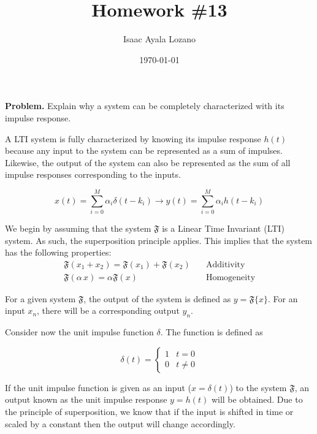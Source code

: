 \documentclass[a4paper,12pt]{article}
\title{Homework \#13}
\author{Isaac Ayala Lozano}
\date{\today}
\begin{document}
\maketitle

\textbf{Problem.} Explain why a system can be completely characterized with its impulse response.

\begin{tcolorbox}[colback=black!5!white,colframe=black!75!black]
  A LTI system is fully characterized by knowing its impulse response $h(t)$ because any input to the system can be represented as a sum of impulses. Likewise, the output of the system can also be represented as the sum of all impulse responses corresponding to the inputs.

  \begin{equation}
   x (t) = \sum_{i = 0}^M \alpha_i \delta(t-k_i) \rightarrow y(t) = \sum_{i = 0}^M \alpha_i h(t-k_i)
  \end{equation}

\end{tcolorbox}

We begin by assuming that the system $\mathfrak{F}$ is a Linear Time Invariant (LTI) system.
As such, the superposition principle applies.
This implies that the system has the following properties:
\begin{align*}
 \mathfrak{F} (x_1 + x_2) = \mathfrak{F}(x_1) + \mathfrak{F}(x_2)  & \quad \text{Additivity}\\
 \mathfrak{F}(\alpha \, x) = \alpha \mathfrak{F}(x)& \quad \text{Homogeneity}
\end{align*}


For a given system $\mathfrak{F}$, the output of the system is defined as $y = \mathfrak{F}\{x\}$.
For an input $x_n$, there will be a corresponding output $y_n$.

Consider now the unit impulse function $\delta$.
The function is defined as

\begin{equation*}
 \delta(t) = \begin{cases}
              1 & t = 0 \\
              0 & t \neq 0
             \end{cases}
\end{equation*}

If the unit impulse function is given as an input ($x = \delta (t)$) to the system $\mathfrak{F}$, an output known as the unit impulse response $y = h(t)$ will be obtained.
Due to the principle of superposition, we know that if the input is shifted in time or scaled by a constant then the output will change accordingly.
\end{document}
